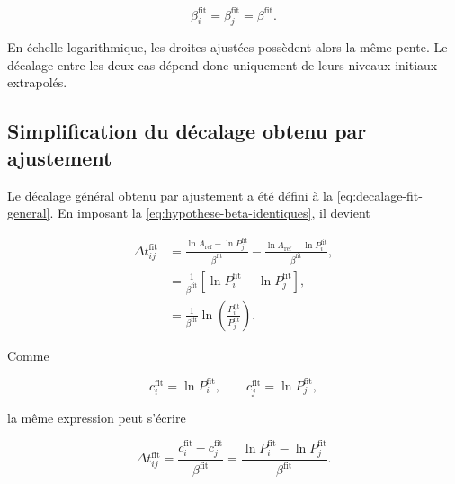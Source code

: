 \documentclass[
    11pt,
    a4paper
]{article}
\begin{document}
\begin{equation}
    \beta_i^{\mathrm{fit}}
    =
    \beta_j^{\mathrm{fit}}
    =
    \beta^{\mathrm{fit}}.
    \label{eq:hypothese-beta-identiques}
\end{equation}

En échelle logarithmique, les droites ajustées possèdent alors la même pente.
Le décalage entre les deux cas dépend donc uniquement de leurs niveaux initiaux
extrapolés.

\subsection{Simplification du décalage obtenu par ajustement}
\label{subsec:simplification-dt-fit-beta-identiques}

Le décalage général obtenu par ajustement a été défini à la
\ref{eq:decalage-fit-general}. En imposant la
\ref{eq:hypothese-beta-identiques}, il devient

\begin{align}
    \Delta t_{ij}^{\mathrm{fit}}
    &=
    \frac{\ln A_{\mathrm{ref}}-\ln P_j^{\mathrm{fit}}}
    {\beta^{\mathrm{fit}}}
    -
    \frac{\ln A_{\mathrm{ref}}-\ln P_i^{\mathrm{fit}}}
    {\beta^{\mathrm{fit}}},
    \nonumber\\
    &=
    \frac{1}{\beta^{\mathrm{fit}}}
    \left[
        \ln P_i^{\mathrm{fit}}
        -
        \ln P_j^{\mathrm{fit}}
    \right],
    \nonumber\\
    &=
    \frac{1}{\beta^{\mathrm{fit}}}
    \ln\left(
        \frac{P_i^{\mathrm{fit}}}
        {P_j^{\mathrm{fit}}}
    \right).
    \label{eq:dt-fit-beta-identiques}
\end{align}

Comme

\begin{equation}
    c_i^{\mathrm{fit}}=\ln P_i^{\mathrm{fit}},
    \qquad
    c_j^{\mathrm{fit}}=\ln P_j^{\mathrm{fit}},
\end{equation}

la même expression peut s’écrire

\begin{equation}
    \Delta t_{ij}^{\mathrm{fit}}
    =
    \frac{
        c_i^{\mathrm{fit}}-c_j^{\mathrm{fit}}
    }{
        \beta^{\mathrm{fit}}
    }
    =
    \frac{
        \ln P_i^{\mathrm{fit}}
        -
        \ln P_j^{\mathrm{fit}}
    }{
        \beta^{\mathrm{fit}}
    }.
    \label{eq:dt-fit-beta-identiques-ci}
\end{equation}
\end{document}
